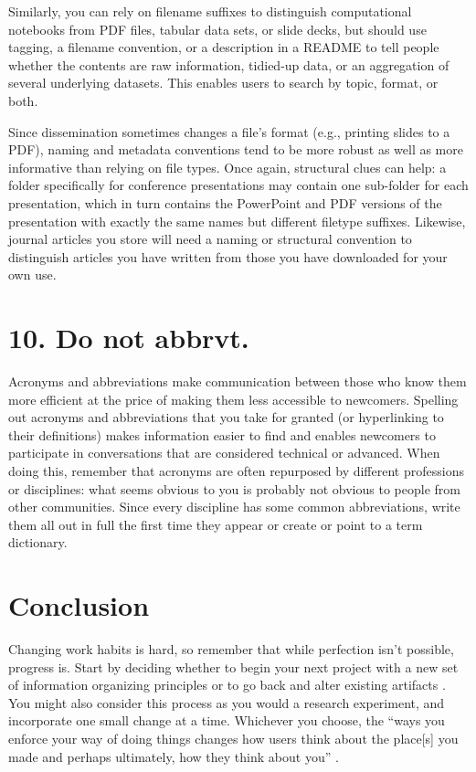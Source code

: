 \documentclass[10pt,letterpaper]{article}
\newcommand{\rulemajor}[1]{\section*{#1}}
\begin{document}
Similarly, you can rely on filename suffixes to distinguish computational
notebooks from PDF files, tabular data sets, or slide decks, but should use
tagging, a filename convention, or a description in a README to tell people
whether the contents are raw information, tidied-up data, or an aggregation of
several underlying datasets. This enables users to search by topic, format, or
both.

Since dissemination sometimes changes a file's format (e.g., printing slides to
a PDF), naming and metadata conventions tend to be more robust as well as more
informative than relying on file types. Once again, structural clues can help: a
folder specifically for conference presentations may contain one sub-folder for
each presentation, which in turn contains the PowerPoint and PDF versions of the
presentation with exactly the same names but different filetype suffixes.
Likewise, journal articles you store will need a naming or structural convention
to distinguish articles you have written from those you have downloaded for your
own use.

\rulemajor{10. Do not abbrvt.}

Acronyms and abbreviations make communication between those who know them more
efficient at the price of making them less accessible to newcomers. Spelling
out acronyms and abbreviations that you take for granted (or hyperlinking to
their definitions) makes information easier to find and enables newcomers
to participate in conversations that are considered technical or advanced. When 
doing this, remember that acronyms are often repurposed by
different professions or disciplines: what seems obvious to you is probably not
obvious to people from other communities. Since every discipline has some common
abbreviations, write them all out in full the first time they appear or create
or point to a term dictionary.

\section*{Conclusion}

Changing work habits is hard, so remember that while perfection isn't possible,
progress is. Start by deciding whether to begin your next project with a new set
of information organizing principles or to go back and alter existing artifacts
\cite{Briney2015}. You might also consider this process as you would a research 
experiment, and incorporate one small change at a time. Whichever you choose, the
``ways you enforce your way of doing things changes how users think about the 
place[s] you made and perhaps ultimately, how they think about you'' \cite{Covert2014}.


\end{document}
